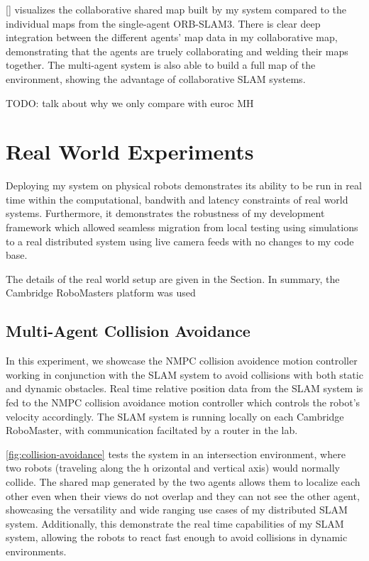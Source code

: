 \autoref{} visualizes the collaborative shared map built by my system compared to the individual maps from the single-agent ORB-SLAM3. There is clear deep integration between the different agents' map data in my collaborative map, demonstrating that the agents are truely collaborating and welding their maps together. The multi-agent system is also able to build a full map of the environment, showing the advantage of collaborative SLAM systems.

TODO: talk about why we only compare with euroc MH


\section{Real World Experiments}
\label{sec:real-world-experiments}
Deploying my system on physical robots demonstrates its ability to be run in real time within the computational, bandwith and latency constraints of real world systems. Furthermore, it demonstrates the robustness of my development framework which allowed seamless migration from local testing using simulations to a real distributed system using live camera feeds with no changes to my code base.

The details of the real world setup are given in the  Section. In summary, the Cambridge RoboMasters platform was used

\subsection{Multi-Agent Collision Avoidance}
\label{sec:multi-agent-collision-avoidance}
In this experiment, we showcase the NMPC collision avoidence motion controller working in conjunction with the SLAM system to avoid collisions with both static and dynamic obstacles. Real time relative position data from the SLAM system is fed to the NMPC collision avoidance motion controller which controls the robot's velocity accordingly. The SLAM system is running locally on each Cambridge RoboMaster, with communication faciltated by a router in the lab.

\autoref{fig:collision-avoidance} tests the system in an intersection environment, where two robots (traveling along the h orizontal and vertical axis) would normally collide. The shared map generated by the two agents allows them to localize each other even when their views do not overlap and they can not see the other agent, showcasing the versatility and wide ranging use cases of my distributed SLAM system. Additionally, this demonstrate the real time capabilities of my SLAM system, allowing the robots to react fast enough to avoid collisions in dynamic environments.

